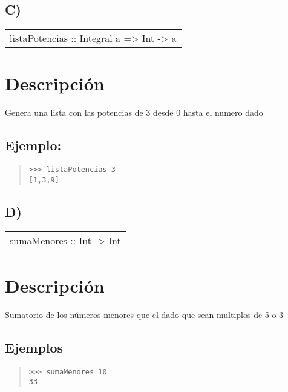 \subsection{C)}
\begin{haddockdesc}
\item[\begin{tabular}{@{}l}
listaPotencias :: Integral a => Int -> {\char 91}a{\char 93}
\end{tabular}]
{\haddockbegindoc
\section*{Descripción}
Genera una lista con las potencias de 3 desde 0 hasta el numero dado\par
\subsection*{Ejemplo:}
\begin{quote}
{\haddockverb\begin{verbatim}
>>> listaPotencias 3
[1,3,9]

\end{verbatim}}
\end{quote}}
\end{haddockdesc}
\subsection{D)}
\begin{haddockdesc}
\item[\begin{tabular}{@{}l}
sumaMenores :: Int -> Int
\end{tabular}]
{\haddockbegindoc
\section*{Descripción}
Sumatorio de los números menores que el dado que sean multiplos de 5 o 3\par
\subsection*{Ejemplos}
\begin{quote}
{\haddockverb\begin{verbatim}
>>> sumaMenores 10
33

\end{verbatim}}
\end{quote}}
\end{haddockdesc}
